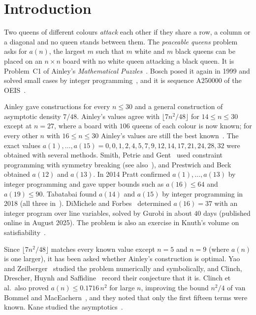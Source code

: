 \documentclass[11pt]{article}
\theoremstyle{remark}
\begin{document}
\section{Introduction}

Two queens of different colours \emph{attack} each other if they share a row, a column or a diagonal and
no queen stands between them. The \emph{peaceable queens} problem asks for $a(n)$, the largest $m$ such
that $m$ white and $m$ black queens can be placed on an $n\times n$ board with no white queen attacking a
black queen. It is Problem~C1 of Ainley's \emph{Mathematical Puzzles}~\cite{Ainley}. Bosch posed it again
in 1999 and solved small cases by integer programming~\cite{Bosch1,Bosch2}, and it is sequence A250000 of
the OEIS~\cite{OEIS}.

Ainley gave constructions for every $n\le30$ and a general construction of asymptotic density $7/48$.
Ainley's values agree with $\lfloor7n^2/48\rfloor$ for $14\le n\le30$ except at $n=27$, where a board
with $106$ queens of each colour is now known; for every other $n$ with $16\le n\le30$ Ainley's values are
still the best known~\cite{OEIS}. The exact values
$a(1),\dots,a(15)=0,0,1,2,4,5,7,9,12,14,17,21,24,28,32$ were obtained with several methods. Smith, Petrie
and Gent~\cite{SPG} used constraint programming with symmetry breaking (see also~\cite{Petrie}), and
Prestwich and Beck~\cite{PB} obtained $a(12)$ and $a(13)$. In 2014 Pratt confirmed $a(1),\dots,a(13)$ by integer
programming and gave upper bounds such as $a(16)\le64$ and $a(19)\le90$. Tabatabai found $a(14)$ and
$a(15)$ by integer programming in 2018 (all three in~\cite{OEIS}). DiMichele and Forbes~\cite{DF}
determined $a(16)=37$ with an integer program over line variables, solved by Gurobi in about $40$ days
(published online in August 2025). The problem is also an exercise in
Knuth's volume on satisfiability~\cite{Knuth}.

Since $\lfloor 7n^2/48\rfloor$ matches every known value except $n=5$ and $n=9$ (where $a(n)$ is one
larger), it has been asked whether Ainley's construction is optimal. Yao and Zeilberger~\cite{YZ}
studied the problem numerically and symbolically, and Clinch, Drescher, Huynh and Saffidine~\cite{CDHS}
record their conjecture that it is. Clinch et al.\ also proved $a(n)\le0.1716\,n^2$ for large $n$,
improving the bound $n^2/4$ of van Bommel and MacEachern~\cite{vBM}, and they noted that only the first
fifteen terms were known. Kane
studied the asymptotics~\cite{Kane}.
\end{document}
